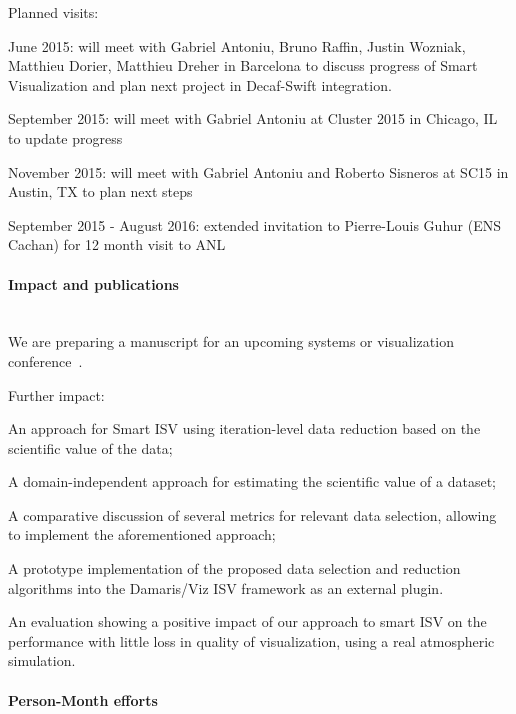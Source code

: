 \begin{refsection}[report2015_tp]
Planned visits:
\begin{itemize*}
\item June 2015: will meet with Gabriel Antoniu, Bruno Raffin, Justin Wozniak, Matthieu Dorier,
  Matthieu Dreher in Barcelona to discuss progress of Smart Visualization and plan next project
  in Decaf-Swift integration.
\item September 2015: will meet with Gabriel Antoniu at Cluster 2015 in Chicago, IL to update
  progress
\item November 2015: will meet with Gabriel Antoniu and Roberto Sisneros at SC15 in Austin, TX to plan next steps
\item September 2015 - August 2016: extended invitation to Pierre-Louis Guhur (ENS Cachan) for
  12 month visit to ANL
\end{itemize*}

\paragraph{Impact and publications}~\\

We are preparing a manuscript for an upcoming systems or visualization
conference~\cite{rahmani15}.

\printbibliography[heading=none,keyword=own]

Further impact:

\begin{itemize*}
\item An approach for Smart ISV using iteration-level data reduction based on the scientific
  value of the data;
\item A domain-independent approach for estimating the scientific value of a dataset;
\item A comparative discussion of several metrics for relevant data selection, allowing to
  implement the aforementioned approach;
\item A prototype implementation of the proposed data selection and reduction algorithms into
  the Damaris/Viz ISV framework as an external plugin.
\item An evaluation showing a positive impact of our approach to smart ISV on the performance
  with little loss in quality of visualization, using a real atmospheric simulation.
\end{itemize*}

\paragraph{Person-Month efforts}~\\


\end{refsection}
